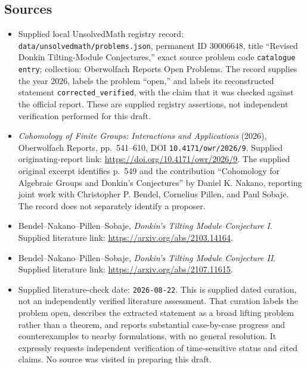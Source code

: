 \documentclass[11pt]{article}
\begin{document}
\subsection{Sources}
\begin{itemize}
\item Supplied local UnsolvedMath registry record: \texttt{data/unsolvedmath/problems.json}, permanent ID \(30006648\), title ``Revised Donkin Tilting-Module Conjectures,'' exact source problem code \texttt{catalogue entry}; collection: Oberwolfach Reports Open Problems. The record supplies the year \(2026\), labels the problem ``open,'' and labels its reconstructed statement \texttt{corrected\_verified}, with the claim that it was checked against the official report. These are supplied registry assertions, not independent verification performed for this draft.
\item \emph{Cohomology of Finite Groups: Interactions and Applications} (2026), Oberwolfach Reports, pp.\ 541--610, DOI \texttt{10.4171/owr/2026/9}. Supplied originating-report link: \url{https://doi.org/10.4171/owr/2026/9}. The supplied original excerpt identifies p.\ 549 and the contribution ``Cohomology for Algebraic Groups and Donkin's Conjectures'' by Daniel K. Nakano, reporting joint work with Christopher P. Bendel, Cornelius Pillen, and Paul Sobaje. The record does not separately identify a proposer.
\item Bendel--Nakano--Pillen--Sobaje, \emph{Donkin's Tilting Module Conjecture I}. Supplied literature link: \url{https://arxiv.org/abs/2103.14164}.
\item Bendel--Nakano--Pillen--Sobaje, \emph{Donkin's Tilting Module Conjecture II}. Supplied literature link: \url{https://arxiv.org/abs/2107.11615}.
\item Supplied literature-check date: \texttt{2026-08-22}. This is supplied dated curation, not an independently verified literature assessment. That curation labels the problem open, describes the extracted statement as a broad lifting problem rather than a theorem, and reports substantial case-by-case progress and counterexamples to nearby formulations, with no general resolution. It expressly requests independent verification of time-sensitive status and cited claims. No source was visited in preparing this draft.
\end{itemize}
\end{document}
